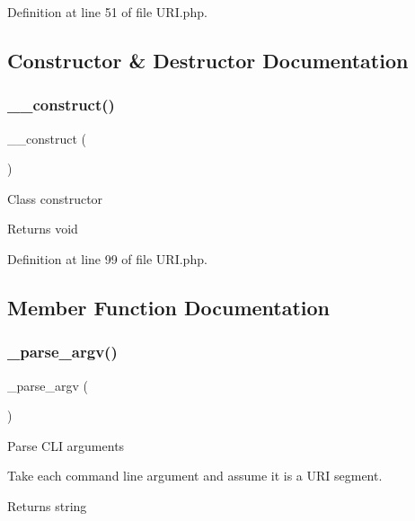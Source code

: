 Definition at line 51 of file U\+R\+I.\+php.



\subsection{Constructor \& Destructor Documentation}
\mbox{\label{class_c_i___u_r_i_a095c5d389db211932136b53f25f39685}} 
\subsubsection{\texorpdfstring{\_\_construct()}{\_\_construct()}}
{\footnotesize\ttfamily \+\_\+\+\_\+construct (\begin{DoxyParamCaption}{ }\end{DoxyParamCaption})}

Class constructor

\begin{DoxyReturn}{Returns}
void 
\end{DoxyReturn}


Definition at line 99 of file U\+R\+I.\+php.



\subsection{Member Function Documentation}
\mbox{\label{class_c_i___u_r_i_a336e05909197d401613263ebdab6550c}} 
\subsubsection{\texorpdfstring{\_parse\_argv()}{\_parse\_argv()}}
{\footnotesize\ttfamily \+\_\+parse\+\_\+argv (\begin{DoxyParamCaption}{ }\end{DoxyParamCaption})\hspace{0.3cm}{\ttfamily [protected]}}

Parse C\+LI arguments

Take each command line argument and assume it is a U\+RI segment.

\begin{DoxyReturn}{Returns}
string 
\end{DoxyReturn}


